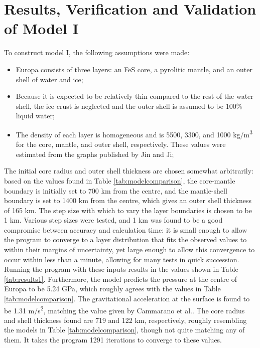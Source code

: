 \documentclass[twocolumn]{article}
\begin{document}
\section{Results, Verification and Validation of Model I}
\label{sec:model1}
To construct model I, the following assumptions were made:
\begin{itemize}
	\item Europa consists of three layers: an FeS core, a pyrolitic mantle, and an outer shell of water and ice;
	\item Because it is expected to be relatively thin compared to the rest of the water shell, the ice crust is neglected and the outer shell is assumed to be 100\% liquid water\cite{jinInternalStructureModels2012};
	\item The density of each layer is homogeneous and is 5500, 3300, and 1000 kg/m\textsuperscript{3} for the core, mantle, and outer shell, respectively. These values were estimated from the graphs published by Jin and Ji\cite{jinInternalStructureModels2012};
\end{itemize}
The initial core radius and outer shell thickness are chosen somewhat arbitrarily: based on the values found in Table \ref{tab:modelcomparison}, the core-mantle boundary is initially set to 700 km from the centre, and the mantle-shell boundary is set to 1400 km from the centre, which gives an outer shell thickness of 165 km. The step size with which to vary the layer boundaries is chosen to be 1 km. Various step sizes were tested, and 1 km was found to be a good compromise between accuracy and calculation time: it is small enough to allow the program to converge to a layer distribution that fits the observed values to within their margins of uncertainty, yet large enough to allow this convergence to occur within less than a minute, allowing for many tests in quick succession.\\
\indent Running the program with these inputs results in the values shown in Table \ref{tab:results1}. Furthermore, the model predicts the pressure at the centre of Europa to be 5.24 GPa, which roughly agrees with the values in Table \ref{tab:modelcomparison}. The gravitational acceleration at the surface is found to be 1.31 m/s\textsuperscript{2}, matching the value
 given by Cammarano et al.\cite{cammaranoLongperiodSeismologyEuropa2006}. The core radius and shell thickness found are 719 and 122 km, respectively, roughly resembling the models in Table \ref{tab:modelcomparison}, though not quite matching any of them. It takes the program 1291 iterations to converge to these values.\\
\end{document}
